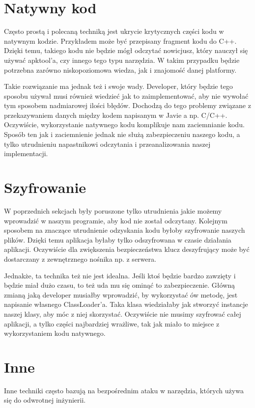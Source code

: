 \documentclass[12pt,a4paper,leqno,oneside,titlepage]{book}
\begin{document}
\section{Natywny kod}
Często prostą i polecaną techniką jest ukrycie krytycznych części kodu w natywnym kodzie. Przykładem może być przepisany fragment kodu do C++. Dzięki temu, takiego kodu nie będzie mógł odczytać nowicjusz, który nauczył się używać apktool'a, czy innego tego typu narzędzia. W takim przypadku będzie potrzebna zarówno niskopoziomowa wiedza, jak i znajomość danej platformy.\par
Takie rozwiązanie ma jednak też i swoje wady. Developer, który będzie tego sposobu używał musi również wiedzieć jak to zaimplementować, aby nie wywołać tym sposobem nadmiarowej ilości błędów. Dochodzą do tego problemy związane z przekazywaniem danych między kodem napisanym w Javie a np. C/C++. Oczywiście, wykorzystanie natywnego kodu komplikuje nam zaciemnianie kodu. Sposób ten jak i zaciemnienie jednak nie służą zabezpieczeniu naszego kodu, a tylko utrudnieniu napastnikowi odczytania i przeanalizowania naszej implementacji.
\section{Szyfrowanie}
W poprzednich sekcjach były poruszone tylko utrudnienia jakie możemy wprowadzić w naszym programie, aby kod nie został odczytany. Kolejnym sposobem na znaczące utrudnienie odzyskania kodu byłoby szyfrowanie naszych plików. Dzięki temu aplikacja byłaby tylko odszyfrowana w czasie działania aplikacji. Oczywiście dla zwiększenia bezpieczeństwa klucz deszyfrujący może być dostarczany z zewnętrznego nośnika np. z serwera.
\par
Jednakże, ta technika też nie jest idealna. Jeśli ktoś będzie bardzo zawzięty i będzie miał dużo czasu, to też uda mu się ominąć to zabezpieczenie. Główną zmianą jaką developer musiałby wprowadzić, by wykorzystać ów metodę, jest napisanie własnego ClassLoader'a. Taka klasa wiedziałaby jak stworzyć instancje naszej klasy, aby móc z niej skorzystać. Oczywiście nie musimy szyfrować całej aplikacji, a tylko części najbardziej wrażliwe, tak jak miało to miejsce z wykorzystaniem kodu natywnego.
%
\section{Inne}
Inne techniki często bazują na bezpośrednim ataku w narzędzia, których używa się do odwrotnej inżynierii.
%
\end{document}
